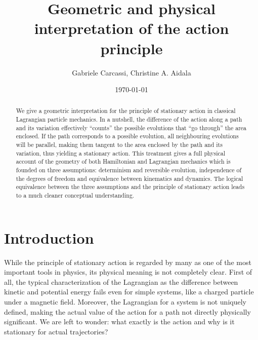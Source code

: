 \documentclass[10pt,twocolumn, nofootinbib]{revtex4-2}
\begin{document}
\title{Geometric and physical interpretation of the action principle}
\author{Gabriele Carcassi, Christine A. Aidala}

\date{\today}


\begin{abstract}
We give a geometric interpretation for the principle of stationary action in classical Lagrangian particle mechanics. In a nutshell, the difference of the action along a path and its variation effectively ``counts'' the possible evolutions that ``go through'' the area enclosed. If the path corresponds to a possible evolution, all neighbouring evolutions will be parallel, making them tangent to the area enclosed by the path and its variation, thus yielding a stationary action. This treatment gives a full physical account of the geometry of both Hamiltonian and Lagrangian mechanics which is founded on three assumptions: determinism and reversible evolution, independence of the degrees of freedom and equivalence between kinematics and dynamics. The logical equivalence between the three assumptions and the principle of stationary action leads to a much cleaner conceptual understanding.
\end{abstract}

\maketitle

\section{Introduction}

While the principle of stationary action is regarded by many as one of the most important tools in physics,\cite{hamilton1834general, heaviside1903, feynman1942principle, brenier1989least, rojo2018principle} its physical meaning is not completely clear. First of all, the typical characterization of the Lagrangian as the difference between kinetic and potential energy fails even for simple systems, like a charged particle under a magnetic field. Moreover, the Lagrangian for a system is not uniquely defined, making the actual value of the action for a path not directly physically significant.  We are left to wonder: what exactly is the action and why is it stationary for actual trajectories?
\end{document}
